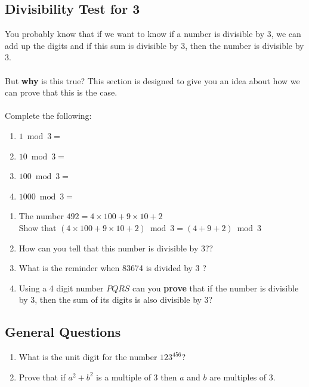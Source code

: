 \documentclass[a4paper,12pt]{article}
\begin{document}
\subsection{Divisibility Test for 3}
You probably know that if we want to know if a number is divisible by 3, we can add up the digits and if this sum is divisible by 3, then the number is divisible by 3.\\\\
But \textbf{why} is this true? This section is designed to give you an idea about how we can prove that this is the case.\\\\
Complete the following:
\begin{enumerate}
\item $1 \bmod 3 =$
\item $10 \bmod 3 =$
\item $100 \bmod 3 =$
\item $1000 \bmod 3 =$
\end{enumerate}
\begin{enumerate}
\item The number $492 = 4 \times 100 + 9 \times 10 + 2$\\
Show that $(4 \times 100 + 9 \times 10 + 2) \bmod 3 = (4+9+2)\bmod 3$
\item How can you tell that this number is divisible by 3??
\item What is the reminder when 83674 is divided by $3$ ?
\item Using a 4 digit number $PQRS$ can you \textbf{prove} that if the number is divisible by 3, then the sum of its digits is also divisible by 3?
\end{enumerate}
\subsection{General Questions}
\begin{enumerate}
\item What is the unit digit for the number $123^{456}$?
\item Prove that if $a^2 + b^2$ is a multiple of 3 then $a$ and $b$ are  multiples of 3.
\end{enumerate}

\newpage
\end{document}
